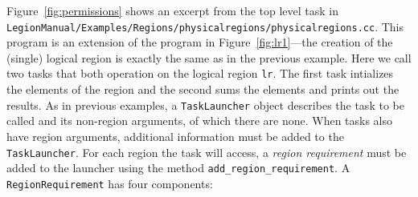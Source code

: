 \documentclass[11pt]{book}
\newcommand{\legionbook}[1]{{\tt LegionManual/Examples/#1}}
\begin{document}
Figure~\ref{fig:permissions} shows an excerpt from the top level task in 
\legionbook{Regions/physicalregions/physicalregions.cc}.  This program is an extension of the
program in Figure~\ref{fig:lr1}---the creation of the (single) logical region is exactly the same as in the 
previous example.  Here we call two tasks that both operation on the logical region {\tt lr}. The first
task intializes the elements of the region and the second sums the elements and prints out the results.
As in previous examples, a {\tt TaskLauncher} object describes the task to be called and its non-region arguments,
of which there are none.  When tasks also have region arguments, additional information must be added
to the {\tt TaskLauncher}.
For each region the task will access, a {\em region requirement} must be added to the launcher using the
method {\tt add\_region\_requirement}.  A {\tt RegionRequirement} has four components: 
\end{document}
